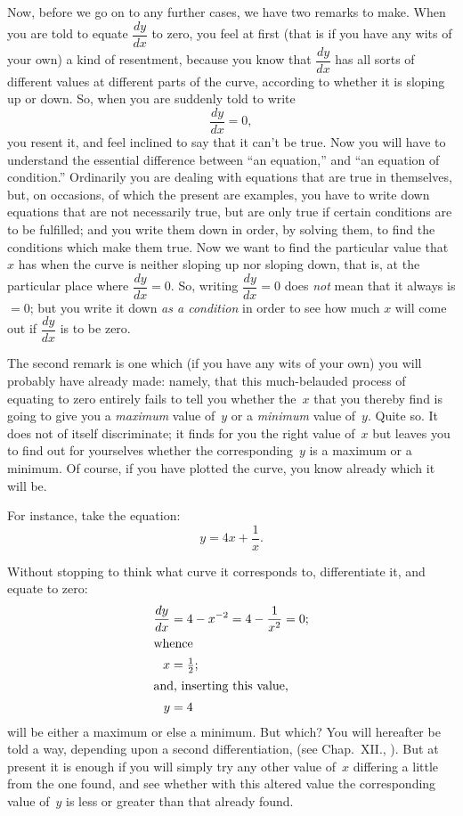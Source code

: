 \documentclass[12pt]{book}[2005/09/16]
\newcommand{\DPPageSep}[2]{\Pagelabel{#2}}
\newcommand{\Pagelabel}[1]
  {\phantomsection\label{#1}}
\newcommand{\Pageref}[2][p.]{%
  \ifthenelse{\not\equal{#1}{}}{%
    \hyperref[#2]{#1~\pageref*{#2}}%
  }{%
    \hyperref[#2]{\pageref{*#2}}%
  }%
}
\begin{document}
Now, before we go on to any further cases, we have
two remarks to make. When you are told to equate
$\dfrac{dy}{dx}$ to zero, you feel at first (that is if you have any
wits of your own) a kind of resentment, because you
know that $\dfrac{dy}{dx}$ has all sorts of different values at
different parts of the curve, according to whether it
is sloping up or down. So, when you are suddenly
told to write
\[
\frac{dy}{dx} = 0,
\]
you resent it, and feel inclined to say that it can't be
true. Now you will have to understand the essential
difference between ``an equation,'' and ``an equation
of condition.'' Ordinarily you are dealing with equations
that are true in themselves, but, on occasions,
of which the present are examples, you have to write
down equations that are not necessarily true, but are
only true if certain conditions are to be fulfilled; and
you write them down in order, by solving them, to
find the conditions which make them true. Now we
want to find the particular value that $x$ has when
the curve is neither sloping up nor sloping down, that
is, at the particular place where $\dfrac{dy}{dx} = 0$. So, writing
$\dfrac{dy}{dx} = 0$ does \emph{not} mean that it always is $=0$; but you
write it down \emph{as a condition} in order to see how
much $x$ will come out if $\dfrac{dy}{dx}$ is to be zero.
\DPPageSep{110.png}{98}%

The second remark is one which (if you have any
wits of your own) you will probably have already
made: namely, that this much-belauded process of
equating to zero entirely fails to tell you whether
the~$x$ that you thereby find is going to give you
a \emph{maximum} value of~$y$ or a \emph{minimum} value of~$y$.
Quite so. It does not of itself discriminate; it finds
for you the right value of~$x$ but leaves you to find
out for yourselves whether the corresponding~$y$ is a
maximum or a minimum. Of course, if you have
plotted the curve, you know already which it will be.

For instance, take the equation:
\[
y = 4x + \frac{1}{x}.
\]

Without stopping to think what curve it corresponds
to, differentiate it, and equate to zero:
\begin{align*}
\frac{dy}{dx}  &= 4 - x^{-2} = 4 - \frac{1}{x^2} = 0; \\
\intertext{whence}
x &= \tfrac{1}{2}; \\
\intertext{and, inserting this value,}
y &= 4
\end{align*}
will be either a maximum or else a minimum. But
which? You will hereafter be told a way, depending
upon a second differentiation, (see Chap.~XII., \Pageref{chap:XII}).
But at present it is enough if you will simply try
any other value of~$x$ differing a little from the one
found, and see whether with this altered value the
corresponding value of~$y$ is less or greater than that
already found.
\DPPageSep{111.png}{99}%
\end{document}
